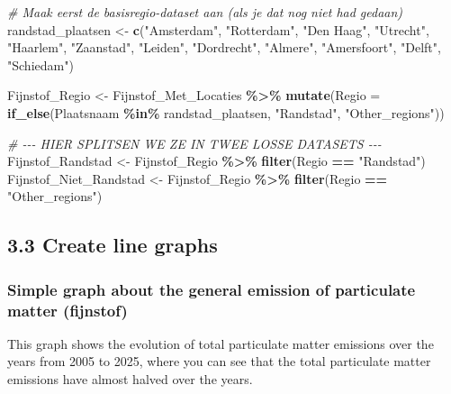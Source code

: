 \documentclass[
]{article}
\newenvironment{Shaded}{\begin{snugshade}}{\end{snugshade}}
\newcommand{\AttributeTok}[1]{\textcolor[rgb]{0.13,0.29,0.53}{#1}}
\newcommand{\CommentTok}[1]{\textcolor[rgb]{0.56,0.35,0.01}{\textit{#1}}}
\newcommand{\FunctionTok}[1]{\textcolor[rgb]{0.13,0.29,0.53}{\textbf{#1}}}
\newcommand{\NormalTok}[1]{#1}
\newcommand{\OtherTok}[1]{\textcolor[rgb]{0.56,0.35,0.01}{#1}}
\newcommand{\SpecialCharTok}[1]{\textcolor[rgb]{0.81,0.36,0.00}{\textbf{#1}}}
\newcommand{\StringTok}[1]{\textcolor[rgb]{0.31,0.60,0.02}{#1}}
\begin{document}
\begin{Shaded}
\begin{Highlighting}[]
\CommentTok{\# Maak eerst de basisregio{-}dataset aan (als je dat nog niet had gedaan)}
\NormalTok{randstad\_plaatsen }\OtherTok{\textless{}{-}} \FunctionTok{c}\NormalTok{(}\StringTok{"Amsterdam"}\NormalTok{, }\StringTok{"Rotterdam"}\NormalTok{, }\StringTok{"Den Haag"}\NormalTok{, }\StringTok{"Utrecht"}\NormalTok{, }
                       \StringTok{"Haarlem"}\NormalTok{, }\StringTok{"Zaanstad"}\NormalTok{, }\StringTok{"Leiden"}\NormalTok{, }\StringTok{"Dordrecht"}\NormalTok{, }
                       \StringTok{"Almere"}\NormalTok{, }\StringTok{"Amersfoort"}\NormalTok{, }\StringTok{"Delft"}\NormalTok{, }\StringTok{"Schiedam"}\NormalTok{)}

\NormalTok{Fijnstof\_Regio }\OtherTok{\textless{}{-}}\NormalTok{ Fijnstof\_Met\_Locaties }\SpecialCharTok{\%\textgreater{}\%}
  \FunctionTok{mutate}\NormalTok{(}\AttributeTok{Regio =} \FunctionTok{if\_else}\NormalTok{(Plaatsnaam }\SpecialCharTok{\%in\%}\NormalTok{ randstad\_plaatsen, }\StringTok{"Randstad"}\NormalTok{, }\StringTok{"Other\_regions"}\NormalTok{))}

\CommentTok{\# {-}{-}{-} HIER SPLITSEN WE ZE IN TWEE LOSSE DATASETS {-}{-}{-}}
\NormalTok{Fijnstof\_Randstad      }\OtherTok{\textless{}{-}}\NormalTok{ Fijnstof\_Regio }\SpecialCharTok{\%\textgreater{}\%} \FunctionTok{filter}\NormalTok{(Regio }\SpecialCharTok{==} \StringTok{"Randstad"}\NormalTok{)}
\NormalTok{Fijnstof\_Niet\_Randstad }\OtherTok{\textless{}{-}}\NormalTok{ Fijnstof\_Regio }\SpecialCharTok{\%\textgreater{}\%} \FunctionTok{filter}\NormalTok{(Regio }\SpecialCharTok{==} \StringTok{"Other\_regions"}\NormalTok{)}
\end{Highlighting}
\end{Shaded}

\subsection{3.3 Create line graphs}\label{create-line-graphs}

\subsubsection{Simple graph about the general emission of particulate
matter
(fijnstof)}\label{simple-graph-about-the-general-emission-of-particulate-matter-fijnstof}

This graph shows the evolution of total particulate matter emissions
over the years from 2005 to 2025, where you can see that the total
particulate matter emissions have almost halved over the years.
\end{document}
